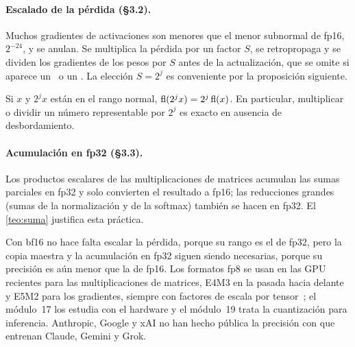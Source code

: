 \paragraph{Escalado de la pérdida (§3.2).} Muchos gradientes de activaciones son menores que el menor subnormal de fp16, $2^{-24}$, y se anulan. Se multiplica la pérdida por un factor $S$, se retropropaga y se dividen los gradientes de los pesos por $S$ antes de la actualización, que se omite si aparece un \Inf\ o un \NaN. La elección $S=2^{j}$ es conveniente por la proposición siguiente.

\begin{proposicion}\label{prop:escala}
Si $x$ y $2^{j}x$ están en el rango normal, $\operatorname{fl}(2^{j}x)=2^{j}\operatorname{fl}(x)$. En particular, multiplicar o dividir un número representable por $2^{j}$ es exacto en ausencia de desbordamiento.
\end{proposicion}

\paragraph{Acumulación en fp32 (§3.3).} Los productos escalares de las multiplicaciones de matrices acumulan las sumas parciales en fp32 y solo convierten el resultado a fp16; las reducciones grandes (sumas de la normalización y de la softmax) también se hacen en fp32. El \cref{teo:suma} justifica esta práctica.

\begin{observacion}[bf16 y fp8]
Con bf16 no hace falta escalar la pérdida, porque su rango es el de fp32, pero la copia maestra y la acumulación en fp32 siguen siendo necesarias, porque su precisión es aún menor que la de fp16. Los formatos fp8 se usan en las GPU recientes para las multiplicaciones de matrices, E4M3 en la pasada hacia delante y E5M2 para los gradientes, siempre con factores de escala por tensor~\cite{fp8}; el módulo~17 los estudia con el hardware y el módulo~19 trata la cuantización para inferencia. Anthropic, Google y xAI no han hecho pública la precisión con que entrenan Claude, Gemini y Grok.
\end{observacion}

